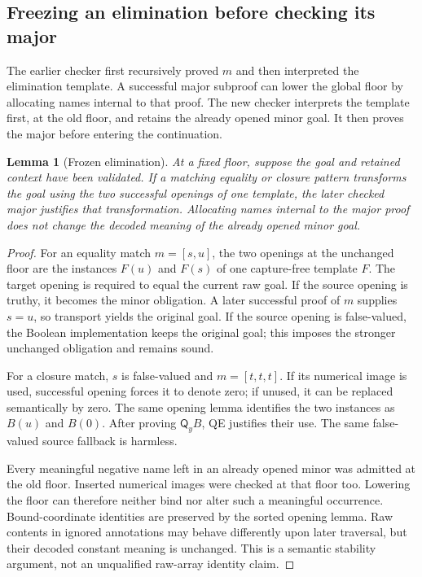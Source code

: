 \documentclass[11pt,letterpaper]{article}
\newtheorem{lemma}[theorem]{Lemma}
\theoremstyle{definition}\newtheorem{definition}[theorem]{Definition}
\theoremstyle{remark}\newtheorem{remark}[theorem]{Remark}
\newcommand{\Q}{\mathsf Q}
\begin{document}
\subsection{Freezing an elimination before checking its major}

The earlier checker first recursively proved $m$ and then interpreted
the elimination template. A successful major subproof can lower the
global floor by allocating names internal to that proof. The new
checker interprets the template first, at the old floor, and retains
the already opened minor goal. It then proves the major before entering
the continuation.

\begin{lemma}[Frozen elimination]
\label{lem:frozen}
At a fixed floor, suppose the goal and retained context have been
validated. If a matching equality or closure pattern transforms the
goal using the two successful openings of one template, the later
checked major justifies that transformation. Allocating names internal
to the major proof does not change the decoded meaning of the already
opened minor goal.
\end{lemma}
\begin{proof}
For an equality match $m=[s,u]$, the two openings at the unchanged floor
are the instances $F(u)$ and $F(s)$ of one capture-free template $F$.
The target opening is required to equal the current raw goal. If the
source opening is truthy, it becomes the minor obligation. A later
successful proof of $m$ supplies $s=u$, so transport yields the original
goal. If the source opening is false-valued, the Boolean implementation
keeps the original goal; this imposes the stronger unchanged obligation
and remains sound.

For a closure match, $s$ is false-valued and $m=[t,t,t]$. If its numerical
image is used, successful opening forces it to denote zero; if unused,
it can be replaced semantically by zero. The same opening lemma identifies
the two instances as $B(u)$ and $B(0)$.
After proving $\Q_yB$, QE justifies their use. The same false-valued
source fallback is harmless.

Every meaningful negative name left in an already opened minor was
admitted at the old floor. Inserted numerical images were checked at
that floor too. Lowering the floor can therefore neither bind nor alter
such a meaningful occurrence. Bound-coordinate identities are preserved
by the sorted opening lemma. Raw contents in ignored annotations may
behave differently upon later traversal, but their decoded constant
meaning is unchanged. This is a semantic stability argument, not an
unqualified raw-array identity claim.
\end{proof}
\end{document}
